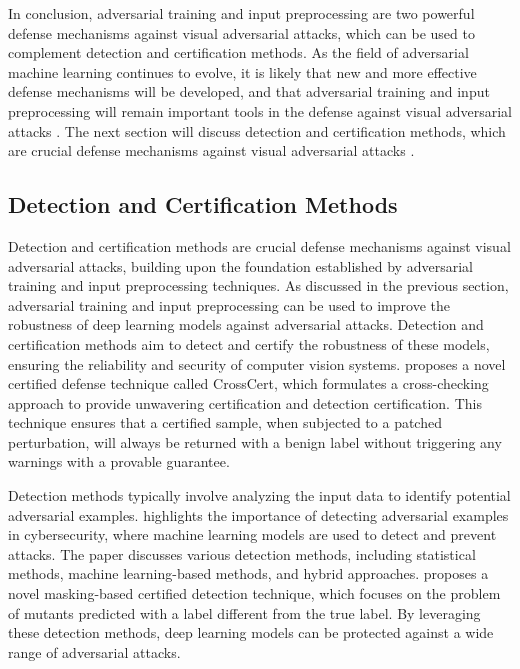 \documentclass[11pt]{article}
\begin{document}
In conclusion, adversarial training and input preprocessing are two powerful defense mechanisms against visual adversarial attacks, which can be used to complement detection and certification methods. As the field of adversarial machine learning continues to evolve, it is likely that new and more effective defense mechanisms will be developed, and that adversarial training and input preprocessing will remain important tools in the defense against visual adversarial attacks \cite{ref84}. The next section will discuss detection and certification methods, which are crucial defense mechanisms against visual adversarial attacks \cite{ref85}.

\subsection{Detection and Certification Methods}

Detection and certification methods are crucial defense mechanisms against visual adversarial attacks, building upon the foundation established by adversarial training and input preprocessing techniques. As discussed in the previous section, adversarial training and input preprocessing can be used to improve the robustness of deep learning models against adversarial attacks. Detection and certification methods aim to detect and certify the robustness of these models, ensuring the reliability and security of computer vision systems. \cite{ref86} proposes a novel certified defense technique called CrossCert, which formulates a cross-checking approach to provide unwavering certification and detection certification. This technique ensures that a certified sample, when subjected to a patched perturbation, will always be returned with a benign label without triggering any warnings with a provable guarantee.

Detection methods typically involve analyzing the input data to identify potential adversarial examples. \cite{ref87} highlights the importance of detecting adversarial examples in cybersecurity, where machine learning models are used to detect and prevent attacks. The paper discusses various detection methods, including statistical methods, machine learning-based methods, and hybrid approaches. \cite{ref88} proposes a novel masking-based certified detection technique, which focuses on the problem of mutants predicted with a label different from the true label. By leveraging these detection methods, deep learning models can be protected against a wide range of adversarial attacks.
\end{document}
